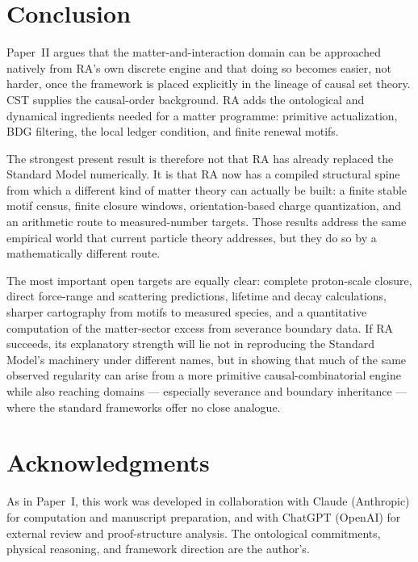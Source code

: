 \documentclass[11pt]{article}
\begin{document}
\section{Conclusion}

Paper~II argues that the matter-and-interaction domain can be approached natively from RA's own discrete engine and that doing so becomes easier, not harder, once the framework is placed explicitly in the lineage of causal set theory. CST supplies the causal-order background. RA adds the ontological and dynamical ingredients needed for a matter programme: primitive actualization, BDG filtering, the local ledger condition, and finite renewal motifs.

The strongest present result is therefore not that RA has already replaced the Standard Model numerically. It is that RA now has a compiled structural spine from which a different kind of matter theory can actually be built: a finite stable motif census, finite closure windows, orientation-based charge quantization, and an arithmetic route to measured-number targets. Those results address the same empirical world that current particle theory addresses, but they do so by a mathematically different route.

The most important open targets are equally clear: complete proton-scale closure, direct force-range and scattering predictions, lifetime and decay calculations, sharper cartography from motifs to measured species, and a quantitative computation of the matter-sector excess from severance boundary data. If RA succeeds, its explanatory strength will lie not in reproducing the Standard Model's machinery under different names, but in showing that much of the same observed regularity can arise from a more primitive causal-combinatorial engine while also reaching domains --- especially severance and boundary inheritance --- where the standard frameworks offer no close analogue.

\section*{Acknowledgments}

As in Paper~I, this work was developed in collaboration with Claude (Anthropic) for computation and manuscript preparation, and with ChatGPT (OpenAI) for external review and proof-structure analysis. The ontological commitments, physical reasoning, and framework direction are the author's.
\end{document}
